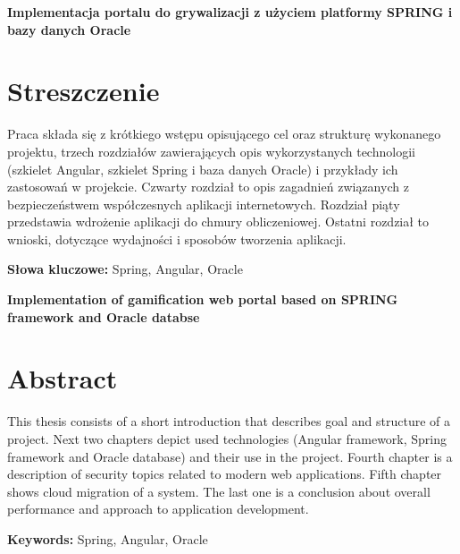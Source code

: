\newpage
\begin{center}
\large \bf
Implementacja portalu do grywalizacji z użyciem platformy SPRING i bazy danych Oracle
\end{center}

\section*{Streszczenie}
Praca składa się z krótkiego wstępu opisującego cel oraz strukturę wykonanego projektu, trzech rozdziałów
zawierających opis wykorzystanych technologii (szkielet Angular, szkielet Spring i baza danych Oracle) i przykłady ich zastosowań w projekcie. Czwarty rozdział to opis zagadnień związanych z bezpieczeństwem współczesnych aplikacji internetowych. Rozdział piąty przedstawia wdrożenie aplikacji do chmury obliczeniowej. Ostatni rozdział to wnioski, dotyczące wydajności i sposobów tworzenia aplikacji.

\bigskip
{\noindent\bf Słowa kluczowe:} Spring, Angular, Oracle

\vskip 2cm


\begin{center}
\large \bf
Implementation of gamification web portal based on SPRING framework and Oracle databse
\end{center}

\section*{Abstract}
This thesis consists of a short introduction that describes goal and structure of a project. Next two chapters depict used technologies (Angular framework, Spring framework and Oracle database) and their use in the project. Fourth chapter is a description of security topics related to modern web applications. Fifth chapter shows cloud migration of a system. The last one is a conclusion about overall performance and approach to application development.

\bigskip
{\noindent\bf Keywords:} Spring, Angular, Oracle

\vfill